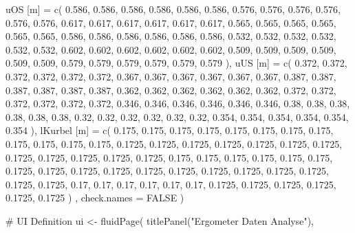 \documentclass[
  letterpaper,
  DIV=11]{scrartcl}
\newenvironment{Shaded}{\begin{snugshade}}{\end{snugshade}}
\newcommand{\NormalTok}[1]{\textcolor[rgb]{0.00,0.23,0.31}{#1}}
\begin{document}
\begin{Shaded}
\begin{Highlighting}[]
\NormalTok{  \textasciigrave{}uOS [m]\textasciigrave{} = c( 0.586, 0.586, 0.586, 0.586, 0.586, 0.586, 0.576, 0.576, 0.576, 0.576, 0.576, 0.576, 0.617, 0.617, 0.617, 0.617, 0.617, 0.617, 0.565, 0.565, 0.565, 0.565, 0.565, 0.565, 0.586, 0.586, 0.586, 0.586, 0.586, 0.586, 0.532, 0.532, 0.532, 0.532, 0.532, 0.532, 0.602, 0.602, 0.602, 0.602, 0.602, 0.602, 0.509, 0.509, 0.509, 0.509, 0.509, 0.509, 0.579, 0.579, 0.579, 0.579, 0.579, 0.579 ),}
\NormalTok{  \textasciigrave{}uUS [m]\textasciigrave{} = c( 0.372, 0.372, 0.372, 0.372, 0.372, 0.372, 0.367, 0.367, 0.367, 0.367, 0.367, 0.367, 0.387, 0.387, 0.387, 0.387, 0.387, 0.387, 0.362, 0.362, 0.362, 0.362, 0.362, 0.362, 0.372, 0.372, 0.372, 0.372, 0.372, 0.372, 0.346, 0.346, 0.346, 0.346, 0.346, 0.346, 0.38, 0.38, 0.38, 0.38, 0.38, 0.38, 0.32, 0.32, 0.32, 0.32, 0.32, 0.32, 0.354, 0.354, 0.354, 0.354, 0.354, 0.354 ),}
\NormalTok{  \textasciigrave{}lKurbel [m]\textasciigrave{} = c( 0.175, 0.175, 0.175, 0.175, 0.175, 0.175, 0.175, 0.175, 0.175, 0.175, 0.175, 0.175, 0.1725, 0.1725, 0.1725, 0.1725, 0.1725, 0.1725, 0.1725, 0.1725, 0.1725, 0.1725, 0.1725, 0.1725, 0.175, 0.175, 0.175, 0.175, 0.175, 0.175, 0.1725, 0.1725, 0.1725, 0.1725, 0.1725, 0.1725, 0.1725, 0.1725, 0.1725, 0.1725, 0.1725, 0.1725, 0.17, 0.17, 0.17, 0.17, 0.17, 0.17, 0.1725, 0.1725, 0.1725, 0.1725, 0.1725, 0.1725 )}
\NormalTok{  , check.names = FALSE}
\NormalTok{)}

\NormalTok{\# UI Definition}
\NormalTok{ui \textless{}{-} fluidPage(}
\NormalTok{  titlePanel("Ergometer Daten Analyse"),}
  

\end{Highlighting}
\end{Shaded}
\end{document}
